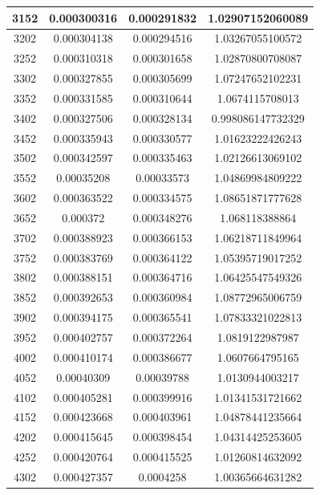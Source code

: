 \documentclass{article}
\begin{document}
\begin{longtable}{|c|c|c|c|}
		3152	&   0.000300316	  & 0.000291832	 &  1.02907152060089   \\ \hline
		3202	&   0.000304138	  & 0.000294516	 &  1.03267055100572   \\ \hline
		3252	&   0.000310318	  & 0.000301658	 &  1.02870800708087   \\ \hline
		3302	&   0.000327855	  & 0.000305699	 &  1.07247652102231   \\ \hline
		3352	&   0.000331585	  & 0.000310644	 &  1.0674115708013   \\ \hline
		3402	&   0.000327506	  & 0.000328134	 &  0.998086147732329   \\ \hline
		3452	&   0.000335943	  & 0.000330577	 &  1.01623222426243   \\ \hline
		3502	&   0.000342597	  & 0.000335463	 &  1.02126613069102   \\ \hline
		3552	&   0.00035208	  & 0.00033573	 &  1.04869984809222   \\ \hline
		3602	&   0.000363522	  & 0.000334575	 &  1.08651871777628   \\ \hline
		3652	&   0.000372	  & 0.000348276	 &  1.068118388864   \\ \hline
		3702	&   0.000388923	  & 0.000366153	 &  1.06218711849964   \\ \hline
		3752	&   0.000383769	  & 0.000364122	 &  1.05395719017252   \\ \hline
		3802	&   0.000388151	  & 0.000364716	 &  1.06425547549326   \\ \hline
		3852	&   0.000392653	  & 0.000360984	 &  1.08772965006759   \\ \hline
		3902	&   0.000394175	  & 0.000365541	 &  1.07833321022813   \\ \hline
		3952	&   0.000402757	  & 0.000372264	 &  1.0819122987987   \\ \hline
		4002	&   0.000410174	  & 0.000386677	 &  1.0607664795165   \\ \hline
		4052	&   0.00040309	  & 0.00039788	 &  1.0130944003217   \\ \hline
		4102	&   0.000405281	  & 0.000399916	 &  1.01341531721662   \\ \hline
		4152	&   0.000423668	  & 0.000403961	 &  1.04878441235664   \\ \hline
		4202	&   0.000415645	  & 0.000398454	 &  1.04314425253605   \\ \hline
		4252	&   0.000420764	  & 0.000415525	 &  1.01260814632092   \\ \hline
		4302	&   0.000427357	  & 0.0004258	 &  1.00365664631282   \\ \hline

\end{longtable}
\end{document}
